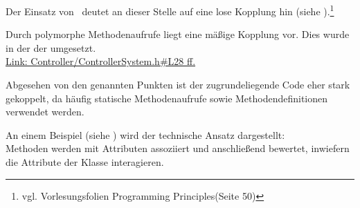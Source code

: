 
Der Einsatz von \ROS\ deutet an dieser Stelle auf eine lose Kopplung hin (siehe ).\footnote{vgl. Vorlesungsfolien \glq Programming Principles\grq (Seite 50)} 

Durch polymorphe Methodenaufrufe liegt eine mäßige Kopplung vor. Dies wurde in der  der  umgesetzt.\\
\href{https://github.com/MobMonRob/ROSLabDrohne/blob/8b5d30dbdfbd41a7e10fa8d512db42cad5bb6d16/Code/Controller/include/Controller/ControllerSystem.h\#L28}{Link: Controller/ControllerSystem.h\#L28 ff.}


Abgesehen von den genannten Punkten ist der zugrundeliegende Code eher stark gekoppelt, da häufig statische Methodenaufrufe sowie Methodendefinitionen verwendet werden.


An einem Beispiel (siehe ) wird der technische Ansatz dargestellt:\\
Methoden werden mit Attributen assoziiert und anschließend bewertet, inwiefern die Attribute der Klasse interagieren.

